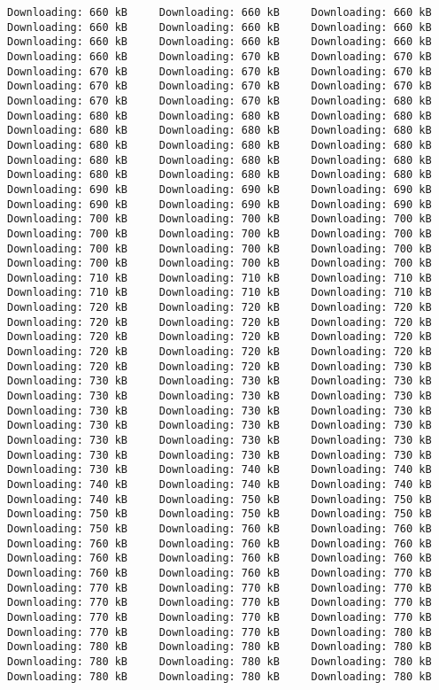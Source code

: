 \documentclass[
  12pt,
  portuguese,
]{report}
\begin{document}
\begin{verbatim}
Downloading: 660 kB     Downloading: 660 kB     Downloading: 660 kB     Downloading: 660 kB     Downloading: 660 kB     Downloading: 660 kB     Downloading: 660 kB     Downloading: 660 kB     Downloading: 660 kB     Downloading: 660 kB     Downloading: 670 kB     Downloading: 670 kB     Downloading: 670 kB     Downloading: 670 kB     Downloading: 670 kB     Downloading: 670 kB     Downloading: 670 kB     Downloading: 670 kB     Downloading: 670 kB     Downloading: 670 kB     Downloading: 680 kB     Downloading: 680 kB     Downloading: 680 kB     Downloading: 680 kB     Downloading: 680 kB     Downloading: 680 kB     Downloading: 680 kB     Downloading: 680 kB     Downloading: 680 kB     Downloading: 680 kB     Downloading: 680 kB     Downloading: 680 kB     Downloading: 680 kB     Downloading: 680 kB     Downloading: 680 kB     Downloading: 680 kB     Downloading: 690 kB     Downloading: 690 kB     Downloading: 690 kB     Downloading: 690 kB     Downloading: 690 kB     Downloading: 690 kB     Downloading: 700 kB     Downloading: 700 kB     Downloading: 700 kB     Downloading: 700 kB     Downloading: 700 kB     Downloading: 700 kB     Downloading: 700 kB     Downloading: 700 kB     Downloading: 700 kB     Downloading: 700 kB     Downloading: 700 kB     Downloading: 700 kB     Downloading: 710 kB     Downloading: 710 kB     Downloading: 710 kB     Downloading: 710 kB     Downloading: 710 kB     Downloading: 710 kB     Downloading: 720 kB     Downloading: 720 kB     Downloading: 720 kB     Downloading: 720 kB     Downloading: 720 kB     Downloading: 720 kB     Downloading: 720 kB     Downloading: 720 kB     Downloading: 720 kB     Downloading: 720 kB     Downloading: 720 kB     Downloading: 720 kB     Downloading: 720 kB     Downloading: 720 kB     Downloading: 730 kB     Downloading: 730 kB     Downloading: 730 kB     Downloading: 730 kB     Downloading: 730 kB     Downloading: 730 kB     Downloading: 730 kB     Downloading: 730 kB     Downloading: 730 kB     Downloading: 730 kB     Downloading: 730 kB     Downloading: 730 kB     Downloading: 730 kB     Downloading: 730 kB     Downloading: 730 kB     Downloading: 730 kB     Downloading: 730 kB     Downloading: 730 kB     Downloading: 730 kB     Downloading: 730 kB     Downloading: 740 kB     Downloading: 740 kB     Downloading: 740 kB     Downloading: 740 kB     Downloading: 740 kB     Downloading: 740 kB     Downloading: 750 kB     Downloading: 750 kB     Downloading: 750 kB     Downloading: 750 kB     Downloading: 750 kB     Downloading: 750 kB     Downloading: 760 kB     Downloading: 760 kB     Downloading: 760 kB     Downloading: 760 kB     Downloading: 760 kB     Downloading: 760 kB     Downloading: 760 kB     Downloading: 760 kB     Downloading: 760 kB     Downloading: 760 kB     Downloading: 770 kB     Downloading: 770 kB     Downloading: 770 kB     Downloading: 770 kB     Downloading: 770 kB     Downloading: 770 kB     Downloading: 770 kB     Downloading: 770 kB     Downloading: 770 kB     Downloading: 770 kB     Downloading: 770 kB     Downloading: 770 kB     Downloading: 780 kB     Downloading: 780 kB     Downloading: 780 kB     Downloading: 780 kB     Downloading: 780 kB     Downloading: 780 kB     Downloading: 780 kB     Downloading: 780 kB     Downloading: 780 kB     Downloading: 780 kB     
\end{verbatim}
\end{document}

